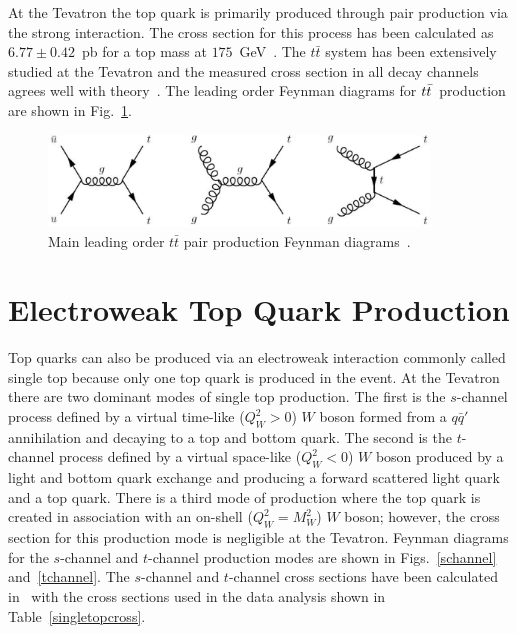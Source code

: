 At the Tevatron the top quark is primarily produced through pair production via the strong interaction. The cross section for this process has been calculated as $6.77 \pm 0.42$~pb for a top mass at $175$~GeV~\cite{Kidonakis:2003qe}. The $t\bar{t}$ system has been extensively studied at the Tevatron and the measured cross section in all decay channels agrees well with theory~\cite{Abazov:2006ka,Abazov:2005yt,Abazov:2005ey,Abazov:2005ex,Abulencia:2006se,Abulencia:2006kv,Abulencia:2006in,Abulencia:2006yk,Acosta:2005zd,Acosta:2005am}. The leading order Feynman diagrams for $\mbox{$t\bar{t}$}$~production are shown in Fig.~\ref{ttbar}.

\begin{figure}[!h!tbp]
\begin{center}
\includegraphics[width=0.9\textwidth]{eps/Theory/TTbar.eps}
\end{center}
\vspace{-0.1in}
\caption{Main leading order $t\bar{t}$ pair production Feynman diagrams~\cite{Jabeen:2006km}.}
\label{ttbar}
\end{figure}

\section{Electroweak Top Quark Production}
\label{electroweaktopquark}

Top quarks can also be produced via an electroweak interaction commonly called single top because only one top quark is produced in the event. At the Tevatron there are two dominant modes of single top production. The first is the $s$-channel process defined by a virtual time-like ($Q^{2}_{W} > 0$) $W$ boson formed from a $q\bar{q}'$ annihilation and decaying to a top and bottom quark. The second is the $t$-channel process defined by a virtual space-like ($Q^{2}_{W} < 0$) $W$ boson produced by a light and bottom quark exchange and producing a forward scattered light quark and a top quark. There is a third mode of production where the top quark is created in association with an on-shell ($Q^{2}_{W}=M^{2}_{W}$) $W$ boson; however, the cross section for this production mode is negligible at the Tevatron. Feynman diagrams for the $s$-channel and $t$-channel production modes are shown in Figs.~\ref{schannel} and~\ref{tchannel}.  The $s$-channel and $t$-channel cross sections have been calculated in~\cite{Smith:1996ij,PhysRevD.56.3114,Stelzer:1997ns,Harris:2002md,Sullivan:2004ie,Cao:2004ap,Cao:2005pq,Kidonakis:2006bu} with the cross sections used in the data analysis shown in Table~\ref{singletopcross}.

